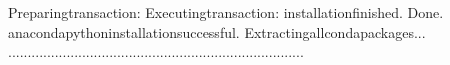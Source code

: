 \documentclass[a4paper,11pt,english]{sphinxmanual}
\begin{document}
\begin{sphinxVerbatim}[commandchars=\\\{\}]
Preparingtransaction:
Executingtransaction:
installationfinished.
\PYGZhy{}\PYGZhy{}\PYGZhy{}\PYGZhy{}\PYGZhy{}\PYGZhy{}\PYGZhy{}\PYGZhy{}\PYGZhy{}\PYGZhy{}\PYGZhy{}\PYGZhy{}\PYGZhy{}\PYGZhy{}\PYGZhy{}\PYGZhy{}\PYGZhy{}\PYGZhy{}\PYGZhy{}\PYGZhy{}\PYGZhy{}\PYGZhy{}\PYGZhy{}\PYGZhy{}\PYGZhy{}\PYGZhy{}\PYGZhy{}\PYGZhy{}\PYGZhy{}\PYGZhy{}\PYGZhy{}\PYGZhy{}\PYGZhy{}\PYGZhy{}\PYGZhy{}\PYGZhy{}\PYGZhy{}\PYGZhy{}\PYGZhy{}\PYGZhy{}\PYGZhy{}\PYGZhy{}\PYGZhy{}\PYGZhy{}\PYGZhy{}\PYGZhy{}\PYGZhy{}\PYGZhy{}\PYGZhy{}\PYGZhy{}\PYGZhy{}\PYGZhy{}\PYGZhy{}\PYGZhy{}\PYGZhy{}\PYGZhy{}\PYGZhy{}\PYGZhy{}\PYGZhy{}\PYGZhy{}\PYGZhy{}\PYGZhy{}\PYGZhy{}\PYGZhy{}\PYGZhy{}\PYGZhy{}\PYGZhy{}\PYGZhy{}\PYGZhy{}\PYGZhy{}\PYGZhy{}\PYGZhy{}
Done.
anacondapythoninstallationsuccessful.
\PYGZhy{}\PYGZhy{}\PYGZhy{}\PYGZhy{}\PYGZhy{}\PYGZhy{}\PYGZhy{}\PYGZhy{}\PYGZhy{}\PYGZhy{}\PYGZhy{}\PYGZhy{}\PYGZhy{}\PYGZhy{}\PYGZhy{}\PYGZhy{}\PYGZhy{}\PYGZhy{}\PYGZhy{}\PYGZhy{}\PYGZhy{}\PYGZhy{}\PYGZhy{}\PYGZhy{}\PYGZhy{}\PYGZhy{}\PYGZhy{}\PYGZhy{}\PYGZhy{}\PYGZhy{}\PYGZhy{}\PYGZhy{}\PYGZhy{}\PYGZhy{}\PYGZhy{}\PYGZhy{}\PYGZhy{}\PYGZhy{}\PYGZhy{}\PYGZhy{}\PYGZhy{}\PYGZhy{}\PYGZhy{}\PYGZhy{}\PYGZhy{}\PYGZhy{}\PYGZhy{}\PYGZhy{}\PYGZhy{}\PYGZhy{}\PYGZhy{}\PYGZhy{}\PYGZhy{}\PYGZhy{}\PYGZhy{}\PYGZhy{}\PYGZhy{}\PYGZhy{}\PYGZhy{}\PYGZhy{}\PYGZhy{}\PYGZhy{}\PYGZhy{}\PYGZhy{}\PYGZhy{}\PYGZhy{}\PYGZhy{}\PYGZhy{}\PYGZhy{}\PYGZhy{}\PYGZhy{}\PYGZhy{}
Extractingallcondapackages...
\PYGZhy{}\PYGZhy{}\PYGZhy{}\PYGZhy{}\PYGZhy{}\PYGZhy{}\PYGZhy{}\PYGZhy{}\PYGZhy{}\PYGZhy{}\PYGZhy{}\PYGZhy{}\PYGZhy{}\PYGZhy{}\PYGZhy{}\PYGZhy{}\PYGZhy{}\PYGZhy{}\PYGZhy{}\PYGZhy{}\PYGZhy{}\PYGZhy{}\PYGZhy{}\PYGZhy{}\PYGZhy{}\PYGZhy{}\PYGZhy{}\PYGZhy{}\PYGZhy{}\PYGZhy{}\PYGZhy{}\PYGZhy{}\PYGZhy{}\PYGZhy{}\PYGZhy{}\PYGZhy{}\PYGZhy{}\PYGZhy{}\PYGZhy{}\PYGZhy{}\PYGZhy{}\PYGZhy{}\PYGZhy{}\PYGZhy{}\PYGZhy{}\PYGZhy{}\PYGZhy{}\PYGZhy{}\PYGZhy{}\PYGZhy{}\PYGZhy{}\PYGZhy{}\PYGZhy{}\PYGZhy{}\PYGZhy{}\PYGZhy{}\PYGZhy{}\PYGZhy{}\PYGZhy{}\PYGZhy{}\PYGZhy{}\PYGZhy{}\PYGZhy{}\PYGZhy{}\PYGZhy{}\PYGZhy{}\PYGZhy{}\PYGZhy{}\PYGZhy{}\PYGZhy{}\PYGZhy{}\PYGZhy{}
............................................................................
\PYGZhy{}\PYGZhy{}\PYGZhy{}\PYGZhy{}\PYGZhy{}\PYGZhy{}\PYGZhy{}\PYGZhy{}\PYGZhy{}\PYGZhy{}\PYGZhy{}\PYGZhy{}\PYGZhy{}\PYGZhy{}\PYGZhy{}\PYGZhy{}\PYGZhy{}\PYGZhy{}\PYGZhy{}\PYGZhy{}\PYGZhy{}\PYGZhy{}\PYGZhy{}\PYGZhy{}\PYGZhy{}\PYGZhy{}\PYGZhy{}\PYGZhy{}\PYGZhy{}\PYGZhy{}\PYGZhy{}\PYGZhy{}\PYGZhy{}\PYGZhy{}\PYGZhy{}\PYGZhy{}\PYGZhy{}\PYGZhy{}\PYGZhy{}\PYGZhy{}\PYGZhy{}\PYGZhy{}\PYGZhy{}\PYGZhy{}\PYGZhy{}\PYGZhy{}\PYGZhy{}\PYGZhy{}\PYGZhy{}\PYGZhy{}\PYGZhy{}\PYGZhy{}\PYGZhy{}\PYGZhy{}\PYGZhy{}\PYGZhy{}\PYGZhy{}\PYGZhy{}\PYGZhy{}\PYGZhy{}\PYGZhy{}\PYGZhy{}\PYGZhy{}\PYGZhy{}\PYGZhy{}\PYGZhy{}\PYGZhy{}\PYGZhy{}\PYGZhy{}\PYGZhy{}\PYGZhy{}\PYGZhy{}

\end{sphinxVerbatim}
\end{document}

